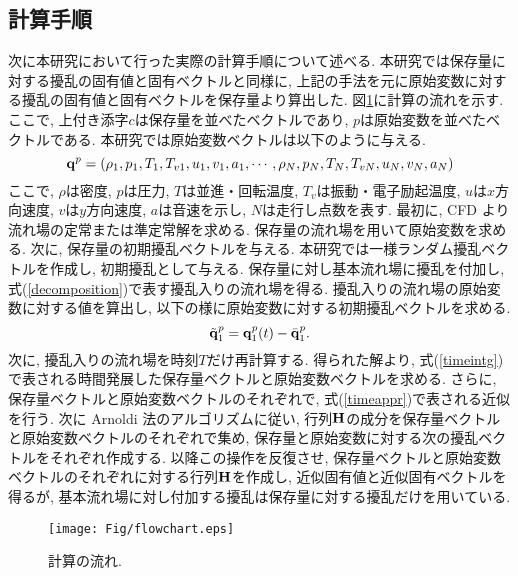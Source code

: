 \subsection*{計算手順}

次に本研究において行った実際の計算手順について述べる.
本研究では保存量に対する擾乱の固有値と固有ベクトルと同様に,
上記の手法を元に原始変数に対する擾乱の固有値と固有ベクトルを保存量より算出した.
図\ref{tab:flowchart2}に計算の流れを示す.
ここで,
上付き添字$c$は保存量を並べたベクトルであり,
$p$は原始変数を並べたベクトルである.
本研究では原始変数ベクトルは以下のように与える.
\begin{equation}
  {\bf q}^{p}=(\rho_1, p_1, T_1, T_{v1}, u_1, v_1, a_1, \cdots
         ,\rho_N, p_N, T_N, T_{vN}, u_N, v_N, a_N) 
\end{equation}
ここで,
$\rho$は密度,
$p$は圧力,
$T$は並進・回転温度,
$T_{v}$は振動・電子励起温度,
$u$は$x$方向速度,
$v$は$y$方向速度,
$a$は音速を示し,
$N$は走行し点数を表す.
最初に,
CFD より流れ場の定常または準定常解を求める.
保存量の流れ場を用いて原始変数を求める.
次に,
保存量の初期擾乱ベクトルを与える.
本研究では一様ランダム擾乱ベクトルを作成し,
初期擾乱として与える.
保存量に対し基本流れ場に擾乱を付加し,
式(\ref{decomposition})で表す擾乱入りの流れ場を得る.
擾乱入りの流れ場の原始変数に対する値を算出し,
以下の様に原始変数に対する初期擾乱ベクトルを求める.
\begin{equation}
{\tilde {\bf q}}^{p}_{1}={\bf q}^{p}_{1}(t)-{\bar {\bf q}}^{p}_{1}.
\end{equation}
次に,
擾乱入りの流れ場を時刻$T$だけ再計算する.
得られた解より,
式(\ref{timeintg})で表される時間発展した保存量ベクトルと原始変数ベクトルを求める.
さらに,
保存量ベクトルと原始変数ベクトルのそれぞれで,
式(\ref{timeappr})で表される近似を行う.
次に Arnoldi 法のアルゴリズムに従い,
行列${\bf H}$の成分を保存量ベクトルと原始変数ベクトルのそれぞれで集め,
保存量と原始変数に対する次の擾乱ベクトルをそれぞれ作成する.
以降この操作を反復させ,
保存量ベクトルと原始変数ベクトルのそれぞれに対する行列${\bf H}$を作成し,
近似固有値と近似固有ベクトルを得るが,
基本流れ場に対し付加する擾乱は保存量に対する擾乱だけを用いている.


\begin{figure}[h]
 \begin{centering}
   \texttt{[image: Fig/flowchart.eps]}
   \caption{計算の流れ.}
   \label{tab:flowchart2}   
 \end{centering}
\end{figure}
